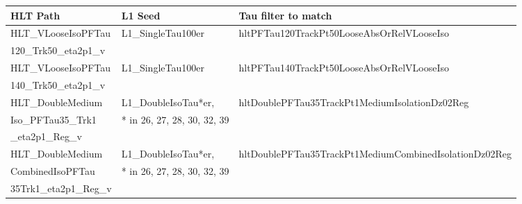 {\footnotesize
\begin{tabularx}{\textwidth}{llX}
\toprule
HLT Path & L1 Seed & Tau filter to match \\
\midrule
HLT\_VLooseIsoPFTau
&
L1\_SingleTau100er
&
hltPFTau120TrackPt50LooseAbsOrRelVLooseIso
\\
120\_Trk50\_eta2p1\_v
\\\hline
HLT\_VLooseIsoPFTau
&
L1\_SingleTau100er
&
hltPFTau140TrackPt50LooseAbsOrRelVLooseIso
\\
140\_Trk50\_eta2p1\_v
\\\hline
HLT\_DoubleMedium
&
L1\_DoubleIsoTau*er,
&
hltDoublePFTau35TrackPt1MediumIsolationDz02Reg
\\
Iso\_PFTau35\_Trk1
&
* in 26, 27, 28, 30, 32, 39
\\
\_eta2p1\_Reg\_v
\\\hline
HLT\_DoubleMedium
&
L1\_DoubleIsoTau*er,
&
hltDoublePFTau35TrackPt1MediumCombinedIsolationDz02Reg
\\
CombinedIsoPFTau
&
* in 26, 27, 28, 30, 32, 39
\\
35Trk1\_eta2p1\_Reg\_v
\\
\bottomrule
\end{tabularx}
}